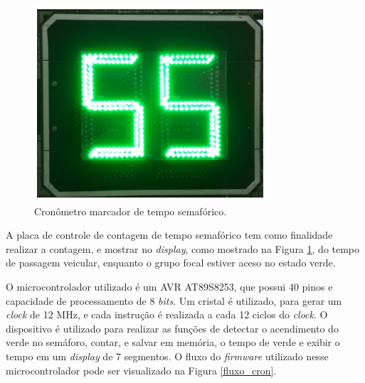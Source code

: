 \begin{figure}[ht]
    \begin{center}
    \includegraphics{figuras/cronometro.PNG}
    \end{center}
    \caption[Sistema de cronômetro]{Cronômetro marcador de tempo semafórico.}
    \label{cronometro}
\end{figure}

A placa de controle de contagem de tempo semafórico tem como finalidade realizar a contagem, e mostrar no \textit{display}, como mostrado na Figura \ref{cronometro}, do tempo de passagem veicular, enquanto o grupo focal estiver aceso no estado verde.

O microcontrolador utilizado é um AVR AT89S8253, que possui 40 pinos e capacidade de processamento de 8 \textit{bits}. Um cristal é utilizado, para gerar um \textit{clock} de 12 MHz, e cada instrução é realizada a cada 12 ciclos do \textit{clock}. O dispositivo é utilizado para realizar as funções de detectar o acendimento do verde no semáforo, contar, e salvar em memória, o tempo de verde e exibir o tempo em um \textit{display} de 7 segmentos. O fluxo do \textit{firmware} utilizado nesse microcontrolador pode ser visualizado na Figura \ref{fluxo_cron}.

